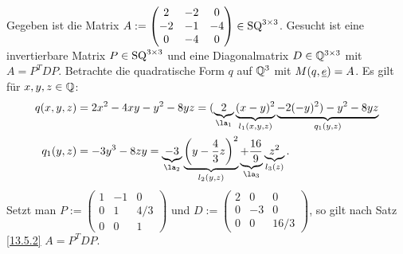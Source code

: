 \documentclass[../../main.tex]{subfiles}
\begin{document}
\begin{bsp}\label{13.5.3}
Gegeben ist die Matrix $A:=\begin{pmatrix*}2&-2&0\\-2&-1&-4\\ 0&-4&0
\end{pmatrix*}\in \SQ^{3\times 3}$. Gesucht ist eine invertierbare Matrix $P\in \operatorname{SQ}^{3\times 3}$ und eine Diagonalmatrix $D\in \mathbb Q^{3\times 3}$ mit $A=P^TDP$. Betrachte die quadratische Form $q$ auf $\mathbb Q^3$ mit $M(q,{\underline e})=A$. Es gilt für $x,y,z\in \mathbb Q$:
\begin{align*}
q(x,y,z)&=2x^2-4xy-y^2-8yz=(\underbrace{2}_{\la_1}\underbrace{(x-y)^2}_{l_1(x,y,z)}\underbrace{-2(-y)^2)-y^2-8yz}_{q_1(y,z)}\\
q_1(y,z)&=-3y^3-8zy=\underbrace{-3}_{\la_2}\underbrace{\left(y-\frac{4}{3}z\right)^2}_{l_2(y,z)}\underbrace{+\frac{16}{9}}_{\la_3}\underbrace{z^2}_{l_3(z)}.
\end{align*}
Setzt man $P:=\begin{pmatrix}1&-1&0\\ 0 & 1 & 4/3\\ 0 & 0 & 1\end{pmatrix}$ und $D:=\begin{pmatrix*}2 & 0 & 0\\ 0 & -3 & 0\\ 0 & 0 &16/3\end{pmatrix*}$, so gilt nach Satz \ref{13.5.2} $A=P^TDP$.
\end{bsp}
\end{document}
